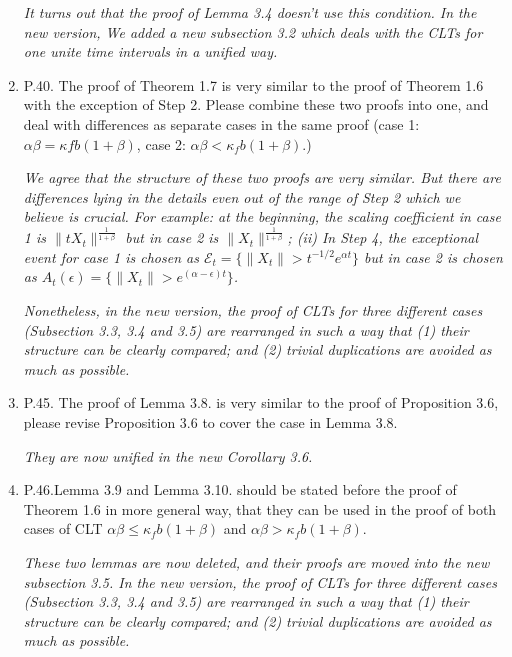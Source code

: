\documentclass[12pt,a4paper]{amsart}
\numberwithin{equation}{section}
\theoremstyle{plain}
\theoremstyle{definition}
\begin{document}
\begin{enumerate}
  \emph{It turns out that the proof of Lemma 3.4 doesn't use this condition. In the new version, We added a new subsection 3.2 which deals with the CLTs for one unite time intervals in a unified way.}

\item
  P.40.
  The proof of Theorem 1.7 is very similar to the proof of Theorem 1.6 with the exception of Step 2. 
  Please combine these two proofs into one, and deal with differences as separate cases in the same proof (case 1: $\alpha \beta = \kappa f b(1 + \beta)$, case 2: $\alpha \beta < \kappa_f b(1 + \beta)$.)

  \emph{We agree that the structure of these two proofs are very similar. But there are differences lying in the details even out of the range of Step 2 which we believe is crucial. For example:  at the beginning, the scaling coefficient in case 1 is $\|tX_t\|^{\frac{1}{1+\beta}}$ but in case 2 is $\|X_t\|^{\frac{1}{1+\beta}}$; (ii) In Step 4, the exceptional event for case 1 is chosen as $\mathcal E_t = \{\|X_t\| > t^{-1/2} e^{\alpha t}\}$ but in case 2 is chosen as $ A_t(\epsilon) = \{\|X_t\|> e^{(\alpha - \epsilon )t}\}$. }

\emph{    
    Nonetheless, in the new version, the proof of CLTs for three different cases (Subsection 3.3, 3.4 and 3.5) are rearranged in such a way that (1) their structure can be clearly compared; and (2) trivial duplications are avoided as much as possible.
}
  
\item
  P.45. 
  The proof of Lemma 3.8. is very similar to the proof of Proposition 3.6, please revise Proposition 3.6 to cover the case in Lemma 3.8.
  
  \emph{They are now unified in the new Corollary 3.6.}

\item
  P.46.Lemma 3.9 and Lemma 3.10. should be stated before the proof of Theorem 1.6 in more general way, that they can be used in the proof of both cases of CLT $\alpha \beta \leq \kappa_f b(1 + \beta)$ and $\alpha \beta > \kappa_f b(1 + \beta).$
  
  \emph{These two lemmas are now deleted, and their proofs are moved into the new subsection 3.5. 
In the new version, the proof of CLTs for three different cases (Subsection 3.3, 3.4 and 3.5) are rearranged in such a way that (1) their structure can be clearly compared; and (2) trivial duplications are avoided as much as possible.}
\end{enumerate}
\end{document}
